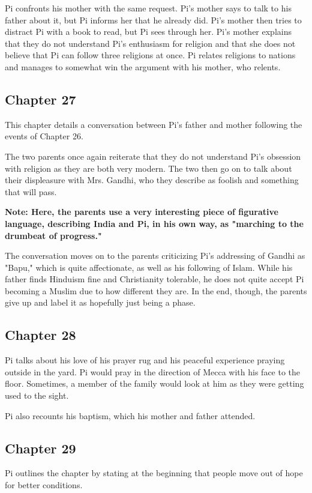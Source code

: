 \documentclass[11pt]{article}
\begin{document}
Pi confronts his mother with the same request. Pi's mother says to talk to his father about it, but Pi informs her that he already did. Pi's mother then tries to distract Pi with a book to read, but Pi sees through her. Pi's mother explains that they do not understand Pi's enthusiasm for religion and that she does not believe that Pi can follow three religions at once. Pi relates religions to nations and manages to somewhat win the argument with his mother, who relents.
\subsection{Chapter 27}
\label{sec:org288dd0d}
This chapter details a conversation between Pi's father and mother following the events of Chapter 26.

The two parents once again reiterate that they do not understand Pi's obsession with religion as they are both very modern. The two then go on to talk about their displeasure with Mrs. Gandhi, who they describe as foolish and something that will pass.

\textbf{Note: Here, the parents use a very interesting piece of figurative language, describing India and Pi, in his own way, as "marching to the drumbeat of progress."}

The conversation moves on to the parents criticizing Pi's addressing of Gandhi as "Bapu," which is quite affectionate, as well as his following of Islam. While his father finds Hinduism fine and Christianity tolerable, he does not quite accept Pi becoming a Muslim due to how different they are. In the end, though, the parents give up and label it as hopefully just being a phase.
\subsection{Chapter 28}
\label{sec:orga01981e}
Pi talks about his love of his prayer rug and his peaceful experience praying outside in the yard. Pi would pray in the direction of Mecca with his face to the floor. Sometimes, a member of the family would look at him as they were getting used to the sight.

Pi also recounts his baptism, which his mother and father attended.
\subsection{Chapter 29}
\label{sec:org97f0f07}
Pi outlines the chapter by stating at the beginning that people move out of hope for better conditions.
\end{document}
